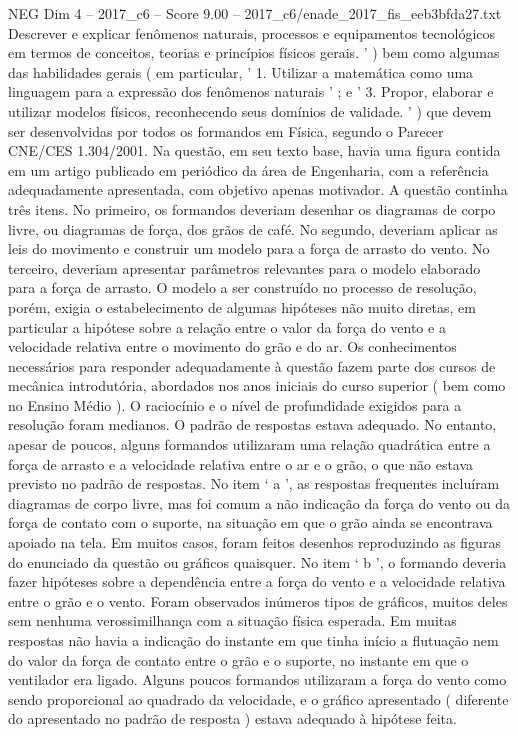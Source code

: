 \begin{textsample}{NEG Dim 4 – 2017\_c6 – Score 9.00 – 2017\_c6/enade\_2017\_fis\_eeb3bfda27.txt}
Descrever e explicar fenômenos naturais, processos e equipamentos tecnológicos em termos de conceitos, teorias e princípios físicos gerais. ' ) bem como algumas das habilidades gerais ( em particular, ' 1.
Utilizar a matemática como uma linguagem para a expressão dos fenômenos naturais ' ; e ' 3.
Propor, elaborar e utilizar modelos físicos, reconhecendo seus domínios de validade. ' ) que devem ser desenvolvidas por todos os formandos em Física, segundo o Parecer CNE/CES 1.304/2001.
Na questão, em seu texto base, havia uma figura contida em um artigo publicado em periódico da área de Engenharia, com a referência adequadamente apresentada, com objetivo apenas motivador.
A questão continha três itens.
No primeiro, os formandos deveriam desenhar os diagramas de corpo livre, ou diagramas de força, dos grãos de café.
No segundo, deveriam aplicar as leis do movimento e construir um modelo para a força de arrasto do vento.
No terceiro, deveriam apresentar parâmetros relevantes para o modelo elaborado para a força de arrasto.
O modelo a ser construído no processo de resolução, porém, exigia o estabelecimento de algumas hipóteses não muito diretas, em particular a hipótese sobre a relação entre o valor da força do vento e a velocidade relativa entre o movimento do grão e do ar.
Os conhecimentos necessários para responder adequadamente à questão fazem parte dos cursos de mecânica introdutória, abordados nos anos iniciais do curso superior ( bem como no Ensino Médio ).
O raciocínio e o nível de profundidade exigidos para a resolução foram medianos.
O padrão de respostas estava adequado.
No entanto, apesar de poucos, alguns formandos utilizaram uma relação quadrática entre a força de arrasto e a velocidade relativa entre o ar e o grão, o que não estava previsto no padrão de respostas.
No item ‘ a ’, as respostas frequentes incluíram diagramas de corpo livre, mas foi comum a não indicação da força do vento ou da força de contato com o suporte, na situação em que o grão ainda se encontrava apoiado na tela.
Em muitos casos, foram feitos desenhos reproduzindo as figuras do enunciado da questão ou gráficos quaisquer.
No item ‘ b ’, o formando deveria fazer hipóteses sobre a dependência entre a força do vento e a velocidade relativa entre o grão e o vento.
Foram observados inúmeros tipos de gráficos, muitos deles sem nenhuma verossimilhança com a situação física esperada.
Em muitas respostas não havia a indicação do instante em que tinha início a flutuação nem do valor da força de contato entre o grão e o suporte, no instante em que o ventilador era ligado.
Alguns poucos formandos utilizaram a força do vento como sendo proporcional ao quadrado da velocidade, e o gráfico apresentado ( diferente do apresentado no padrão de resposta ) estava adequado à hipótese feita.

\end{textsample}
